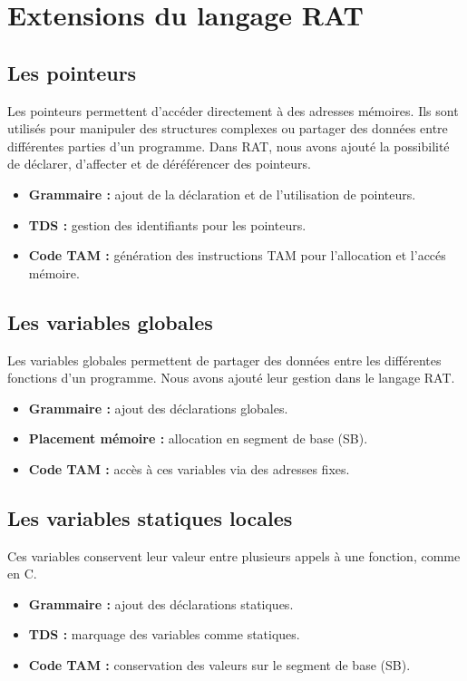 \documentclass[a4paper,12pt]{article}
\begin{document}
\section{Extensions du langage RAT}
\subsection{Les pointeurs}
Les pointeurs permettent d'acc\'eder directement \`a des adresses m\'emoires. Ils sont utilis\'es pour manipuler des structures complexes ou partager des donn\'ees entre diff\'erentes parties d'un programme. Dans RAT, nous avons ajout\'e la possibilit\'e de d\'eclarer, d'affecter et de d\'er\'ef\'erencer des pointeurs.
\begin{itemize}
    \item \textbf{Grammaire :} ajout de la d\'eclaration et de l'utilisation de pointeurs.
    \item \textbf{TDS :} gestion des identifiants pour les pointeurs.
    \item \textbf{Code TAM :} g\'en\'eration des instructions TAM pour l'allocation et l'acc\'es m\'emoire.
\end{itemize}

\subsection{Les variables globales}
Les variables globales permettent de partager des donn\'ees entre les diff\'erentes fonctions d'un programme. Nous avons ajout\'e leur gestion dans le langage RAT.
\begin{itemize}
    \item \textbf{Grammaire :} ajout des d\'eclarations globales.
    \item \textbf{Placement m\'emoire :} allocation en segment de base (SB).
    \item \textbf{Code TAM :} acc\`es \`a ces variables via des adresses fixes.
\end{itemize}

\subsection{Les variables statiques locales}
Ces variables conservent leur valeur entre plusieurs appels \`a une fonction, comme en C.
\begin{itemize}
    \item \textbf{Grammaire :} ajout des d\'eclarations statiques.
    \item \textbf{TDS :} marquage des variables comme statiques.
    \item \textbf{Code TAM :} conservation des valeurs sur le segment de base (SB).
\end{itemize}
\end{document}
